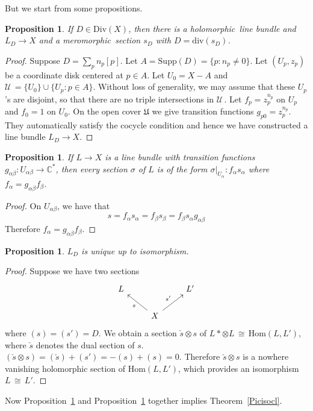 \documentclass[12pt]{article}
\theoremstyle{plain}
\newtheorem{proposition}[equation]{Proposition}
\theoremstyle{definition}
\newcommand{\fU}{\mathfrak{U}}
\newcommand{\sU}{\mathcal{U}\,}
\newcommand{\IC}{\mathbb{C}}
\newcommand{\Hom}{\mathrm{Hom}}
\newcommand\iso{{\, \cong \,}}
\newcommand\tensor{{\otimes}}
\newcommand{\<}{\langle}
\renewcommand{\>}{\rangle}
\newcommand{\Div}{\mathrm{Div}}
\renewcommand{\div}{\mathrm{div}}
\newcommand{\holo}{holomorphic \,}
\newcommand{\mero}{meromorphic \,}
\newcommand{\Supp}{\mathrm{Supp}}
\begin{document}
But we start from some propositions. 
\begin{proposition}
\label{Picsurj}
If $D \in \Div(X)$, then there is a \holo line bundle and $L_D \to X$ and a \mero section $s_D$ with $D = \div(s_D)$. 
\end{proposition}
\begin{proof}
Suppose $D = \sum_p n_p [p]$. Let $ A = \Supp(D) = \{ p : n_p \neq 0 \}$. Let $(U_p, z_p)$ be a coordinate disk centered at $p \in A$. Let $U_0 = X - A$ and $\sU = \{ U_0 \} \cup \{ U_p : p \in A \}$. Without loss of generality, we may assume that these $U_p$'s are disjoint, so that there are no triple intersections in $\sU$. Let $f_p = z_p^{n_p}$ on $U_p$ and $f_0 = 1$ on $U_0$. On the open cover $\fU$ we give transition functions $g_{p0} = z_p^{n_p}$. They automatically satisfy the cocycle condition and hence we have constructed a line bundle $L_D \to X$. 
\end{proof}

\begin{proposition}
If $L \to X$ is a line bundle with transition functions $g_{\alpha \beta} : U_{\alpha \beta} \to \IC^*$, then every section $\sigma$ of $L$ is of the form $\sigma|_{U_\alpha} : f_\alpha s_\alpha$ where $f_\alpha = g_{\alpha \beta} f_\beta$. 
\end{proposition}
\begin{proof}
On $U_{\alpha \beta}$, we have that 
$$ s = f_\alpha s_\alpha = f_\beta s_\beta = f_\beta s_\alpha g_{\alpha \beta} $$
Therefore $f_\alpha = g_{\alpha \beta} f_\beta$. 
\end{proof}

\begin{proposition}
\label{Picinj}
$L_D$ is unique up to isomorphism. 
\end{proposition}
\begin{proof}
Suppose we have two sections 
\[
\begin{tikzcd}
L && L' \\
{} & X \arrow{lu}{s} \arrow{ru}{s'}
\end{tikzcd}
\]
where $(s) = (s') = D$. We obtain a section $\check{s} \tensor s$ of $L* \tensor L \iso \Hom(L, L')$, where $\check{s}$ denotes the dual section of $s$. $(\check{s} \tensor s) = (\check{s}) + (s') = -(s) + (s) = 0$. Therefore $\check{s} \tensor s$ is a nowhere vanishing holomorphic section of $\Hom(L, L')$, which provides an isomorphism $L \iso L'$. 
\end{proof}
Now Proposition~\ref{Picsurj} and Proposition~\ref{Picinj} together implies Theorem~\ref{Picisocl}. 
\end{document}
